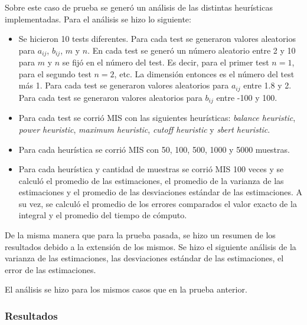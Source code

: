 \documentclass{article}
\begin{document}
Sobre este caso de prueba se generó un análisis de las distintas heurísticas implementadas.
Para el análisis se hizo lo siguiente:
\begin{itemize}
    \item Se hicieron 10 tests diferentes. Para cada test se generaron valores aleatorios para \( a_{ij} \), \( b_{ij} \), \( m \) y \( n \).
          En cada test se generó un número aleatorio entre 2 y 10 para \( m \) y \( n \) se fijó en el número del test.
          Es decir, para el primer test \( n = 1 \), para el segundo test \( n = 2 \), etc. La dimensión entonces es el número del test más 1.
          Para cada test se generaron valores aleatorios para \( a_{ij} \) entre 1.8 y 2.
          Para cada test se generaron valores aleatorios para \( b_{ij} \) entre -100 y 100.
    \item Para cada test se corrió MIS con las siguientes heurísticas: \textit{balance heuristic}, \textit{power heuristic}, \textit{maximum heuristic}, \textit{cutoff heuristic} y \textit{sbert heuristic}.
    \item Para cada heurística se corrió MIS con 50, 100, 500, 1000 y 5000 muestras.
    \item Para cada heurística y cantidad de muestras se corrió MIS 100 veces y se calculó el promedio de las estimaciones,
          el promedio de la varianza de las estimaciones y el promedio de las desviaciones estándar de las estimaciones.
          A su vez, se calculó el promedio de los errores comparados el valor exacto de la integral y el promedio del tiempo de cómputo.
\end{itemize}

De la misma manera que para la prueba pasada, se hizo un resumen de los resultados debido a la extensión de los mismos.
Se hizo el siguiente análisis de la varianza de las estimaciones, las desviaciones estándar de las estimaciones, el error de las estimaciones.

El análisis se hizo para los mismos casos que en la prueba anterior.

\subsubsection{Resultados}
\end{document}
